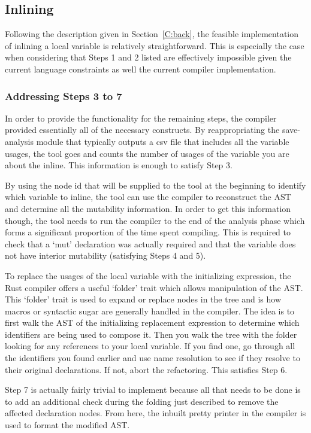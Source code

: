 \subsection{Inlining}

Following the description given in Section~\ref{C:back}, the feasible implementation of inlining a local variable is relatively straightforward. This is especially the case when considering that Steps 1 and 2 listed are effectively impossible given the current language constraints as well the current compiler implementation.

\subsubsection{Addressing Steps 3 to 7}
In order to provide the functionality for the remaining steps, the compiler provided essentially all of the necessary constructs. By reappropriating the save-analysis module that typically outputs a csv file that includes all the variable usages, the tool goes and counts the number of usages of the variable you are about the inline. This information is enough to satisfy Step 3.

By using the node id that will be supplied to the tool at the beginning to identify which variable to inline, the tool can use the compiler to reconstruct the AST and determine all the mutability information. In order to get this information though, the tool needs to run the compiler to the end of the analysis phase which forms a significant proportion of the time spent compiling. This is required to check that a `mut' declaration was actually required and that the variable does not have interior mutability (satisfying Steps 4 and 5).

To replace the usages of the local variable with the initializing expression, the Rust compiler offers a useful `folder' trait which allows manipulation of the AST. This `folder' trait is used to expand or replace nodes in the tree and is how macros or syntactic sugar are generally handled in the compiler. The idea is to first walk the AST of the initializing replacement expression to determine which identifiers are being used to compose it. Then you walk the tree with the folder looking for any references to your local variable. If you find one, go through all the identifiers you found earlier and use name resolution to see if they resolve to their original declarations. If not, abort the refactoring. This satisfies Step 6.

Step 7 is actually fairly trivial to implement because all that needs to be done is to add an additional check during the folding just described to remove the affected declaration nodes. From here, the inbuilt pretty printer in the compiler is used to format the modified AST.

